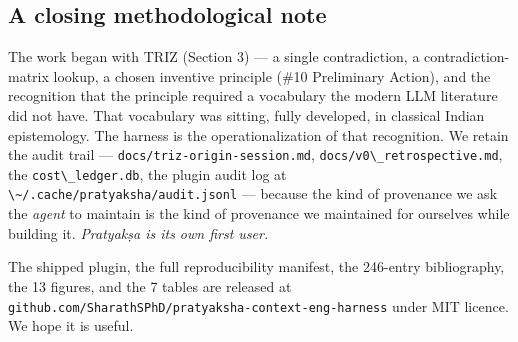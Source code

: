 \subsection{A closing methodological note}\label{a-closing-methodological-note}

The work began with TRIZ (Section 3) --- a single contradiction, a contradiction-matrix lookup, a chosen inventive principle (\#10 Preliminary Action), and the recognition that the principle required a vocabulary the modern LLM literature did not have. That vocabulary was sitting, fully developed, in classical Indian epistemology. The harness is the operationalization of that recognition. We retain the audit trail --- \passthrough{\lstinline!docs/triz-origin-session.md!}, \passthrough{\lstinline!docs/v0\_retrospective.md!}, the \passthrough{\lstinline!cost\_ledger.db!}, the plugin audit log at \passthrough{\lstinline!\~/.cache/pratyaksha/audit.jsonl!} --- because the kind of provenance we ask the \emph{agent} to maintain is the kind of provenance we maintained for ourselves while building it. \emph{Pratyakṣa is its own first user.}

The shipped plugin, the full reproducibility manifest, the 246-entry bibliography, the 13 figures, and the 7 tables are released at \passthrough{\lstinline!github.com/SharathSPhD/pratyaksha-context-eng-harness!} under MIT licence. We hope it is useful.
